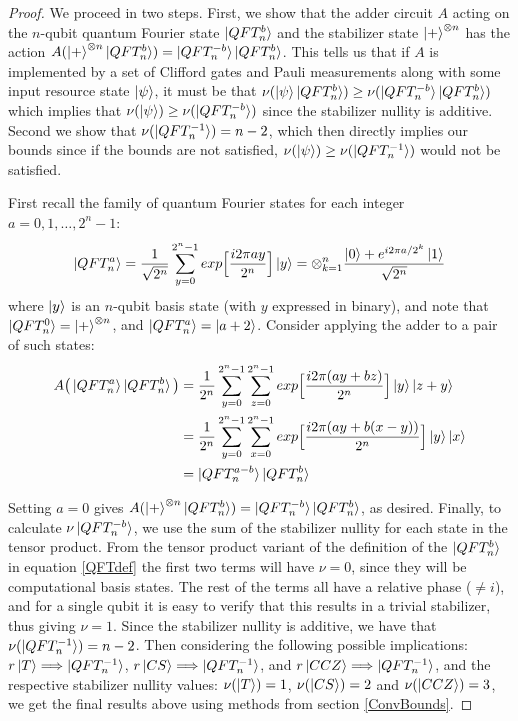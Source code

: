 \documentclass[12pt]{dalthesis}
\begin{document}
\begin{proof}
We proceed in two steps. First, we show that the adder circuit $A$ acting on the $n$-qubit quantum Fourier state $\ket{QFT_n^b}$ and the stabilizer state $\ket{+}^{\otimes n}$ has the action $A(\ket{+}^{\otimes n} \ket{QFT_n^b}) = \ket{QFT_n^{-b}}\ket{QFT_n^b}$. This tells us that if $A$ is implemented by a set of Clifford gates and Pauli measurements along with some input resource state $\ket{\psi}$, it must be that $\nu (\ket{\psi} \ket{QFT_n^b}) \geq \nu(\ket{QFT_n^{-b}} \ket{QFT_n^b})$ which implies that $\nu (\ket{\psi}) \geq \nu(\ket{QFT_n^{-b}})$ since the stabilizer nullity is additive. Second we show that $\nu(\ket{QFT_n^{-1}}) = n-2$, which then directly implies our bounds since if the bounds are not satisfied, $\nu(\ket{\psi}) \geq \nu(\ket{QFT_n^{-1}})$ would not be satisfied.

First recall the family of quantum Fourier states for each integer $a = 0, 1, \dots, 2^n - 1$:
\begin{equation}
\label{QFTdef}
\ket{QFT_n^a} = \frac{1}{\sqrt{2^n}} \sum\limits_{y=0}^{2^n-1} exp \Big[ \frac{i2 \pi a y}{2^n} \Big] \ket{y} = \otimes_{k=1}^n \frac{\ket{0} + e^{i2\pi a/2^k} \ket{1}}{\sqrt{2^n}}
\end{equation}
where $\ket{y}$ is an $n$-qubit basis state (with $y$ expressed in binary), and note that $\ket{QFT_n^0} = \ket{+}^{\otimes n}$, and $\ket{QFT_n^a} = \ket{a + 2}$. Consider applying the adder to a pair of such states:
\begin{equation}
\begin{split}
A \big(\ket{QFT_n^a} \ket{QFT_n^b} \big) & = \frac{1}{2^n} \sum\limits_{y=0}^{2^n-1} \sum\limits_{z=0}^{2^n-1} exp \Big[ \frac{i2 \pi (ay + bz)}{2^n} \Big] \ket{y}\ket{z+y} \\
& = \frac{1}{2^n} \sum\limits_{y=0}^{2^n-1} \sum\limits_{x=0}^{2^n-1} exp \Big[ \frac{i2 \pi (ay + b(x-y))}{2^n} \Big] \ket{y}\ket{x} \\
& = \ket{QFT_n^{a-b}}\ket{QFT_n^b}
\end{split}
\end{equation}

Setting $a=0$ gives $A(\ket{+}^{\otimes n} \ket{QFT_n^b}) = \ket{QFT_n^{-b}}\ket{QFT_n^b}$, as desired. Finally, to calculate $\nu \ket{QFT_n^{-b}}$, we use the sum of the stabilizer nullity for each state in the tensor product. From the tensor product variant of the definition of the $\ket{QFT_n^b}$ in equation \ref{QFTdef} the first two terms will have $\nu = 0$, since they will be computational basis states. The rest of the terms all have a relative phase ($\neq i$), and for a single qubit it is easy to verify that this results in a trivial stabilizer, thus giving $\nu = 1$. Since the stabilizer nullity is additive, we have that $\nu(\ket{QFT_n^{-1}}) = n-2$. Then considering the following possible implications: $r\ket{T} \Longrightarrow \ket{QFT_n^{-1}}$, $r\ket{CS} \Longrightarrow \ket{QFT_n^{-1}}$, and $r\ket{CCZ} \Longrightarrow \ket{QFT_n^{-1}}$, and the respective stabilizer nullity values: $\nu (\ket{T}) = 1$, $\nu (\ket{CS}) = 2$ and $\nu (\ket{CCZ}) = 3$, we get the final results above using methods from section \ref{ConvBounds}.
\end{proof}
\end{document}
